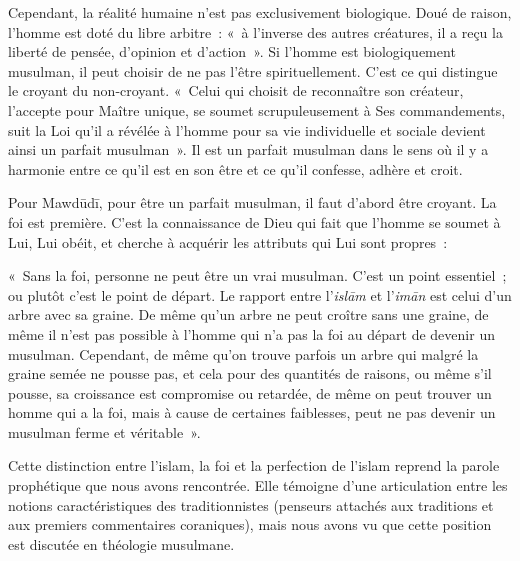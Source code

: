 Cependant, la réalité humaine n'est pas exclusivement biologique. Doué
de raison, l'homme est doté du libre arbitre~: «~à l'inverse des autres
créatures, il a reçu la liberté de pensée, d'opinion et
d'action~». Si l'homme est biologiquement
musulman, il peut choisir de ne pas l'être spirituellement. C'est ce qui
distingue le croyant du non-croyant. «~Celui qui choisit de reconnaître
son créateur, l'accepte pour Maître unique, se soumet scrupuleusement à
Ses commandements, suit la Loi qu'il a révélée à l'homme pour sa vie
individuelle et sociale devient ainsi un parfait musulman~». Il est un parfait musulman dans le sens où il y a harmonie
entre ce qu'il est en son être et ce qu'il confesse, adhère et croit.

Pour Mawdūdī, pour être un parfait musulman, il faut d'abord être
croyant. La foi est première. C'est la connaissance de Dieu qui fait que
l'homme se soumet à Lui, Lui obéit, et cherche à acquérir les attributs
qui Lui sont propres~:

«~Sans la foi, personne ne peut être un vrai musulman. C'est un point
essentiel~; ou plutôt c'est le point de départ. Le rapport entre
l'\emph{islām} et l'\emph{imān} est celui d'un arbre avec sa graine. De
même qu'un arbre ne peut croître sans une graine, de même il n'est pas
possible à l'homme qui n'a pas la foi au départ de devenir un musulman.
Cependant, de même qu'on trouve parfois un arbre qui malgré la graine
semée ne pousse pas, et cela pour des quantités de raisons, ou même s'il
pousse, sa croissance est compromise ou retardée, de même on peut
trouver un homme qui a la foi, mais à cause de certaines faiblesses,
peut ne pas devenir un musulman ferme et véritable~».

Cette distinction entre l'islam, la foi et la perfection de l'islam
reprend la parole prophétique que nous avons rencontrée. Elle témoigne
d'une articulation entre les notions caractéristiques des
traditionnistes (penseurs attachés aux traditions et aux premiers
commentaires coraniques), mais nous avons vu que cette position est
discutée en théologie musulmane.


